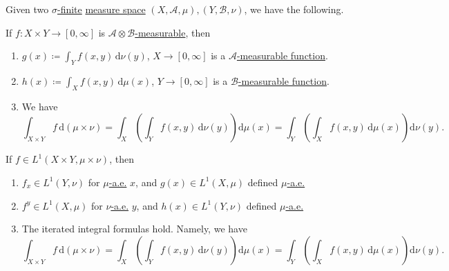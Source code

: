 \begin{theorem}\label{thm:Fubini-Tonelli-theorem}
	Given two \hyperref[def:finite-measure]{\(\sigma \)-finite} \hyperref[def:measure-space]{measure space} \((X, \mathcal{A} , \mu ), (Y, \mathcal{B} , \nu )\),
	we have the following.

	\begin{theorem*}\label{thm:Tonelli-theorem}
		If \(f\colon X\times Y\to [0, \infty ]\) is \hyperref[def:A-measurable-function]{\(\mathcal{A} \otimes \mathcal{B} \)-measurable},
		then
		\begin{enumerate}[(1)]
			\item \(g(x)\coloneqq \int_Y f(x, y)\,\mathrm{d} \nu (y)\), \(X\to [0, \infty ]\) is a \hyperref[def:A-measurable-function]{\(\mathcal{A}\)-measurable function}.
			\item \(h(x)\coloneqq \int_X f(x, y)\,\mathrm{d} \mu (x)\), \(Y\to [0, \infty ]\) is a \hyperref[def:A-measurable-function]{\(\mathcal{B}\)-measurable function}.
			\item We have
			      \[
				      \int_{X\times Y} f \,\mathrm{d}(\mu \times \nu ) = \int _X\left(\int _Y f(x, y)\,\mathrm{d}\nu (y)\right)\mathrm{d} \mu (x) = \int _Y\left(\int_X f(x, y)\,\mathrm{d} \mu (x)\right)\mathrm{d} \nu (y).
			      \]
		\end{enumerate}
	\end{theorem*}

	\begin{theorem*}\label{thm:Fubini-theorem}
		If \(f\in L^1(X\times Y, \mu \times \nu )\), then
		\begin{enumerate}[(1)]
			\item \(f_{x} \in L^1(Y, \nu )\) for \hyperref[def:mu-almost-everywhere]{\(\mu\)-a.e.} \(x\), and \(g(x)\in L^1(X, \mu )\) defined \hyperref[def:mu-almost-everywhere]{\(\mu\)-a.e.}
			\item \(f^{y} \in L^1(X, \mu )\) for \hyperref[def:mu-almost-everywhere]{\(\nu\)-a.e.} \(y\), and \(h(x)\in L^1(Y, \nu )\) defined \hyperref[def:mu-almost-everywhere]{\(\mu\)-a.e.}
			\item The iterated integral formulas hold. Namely, we have
			      \[
				      \int_{X\times Y} f \,\mathrm{d}(\mu \times \nu ) = \int _X\left(\int _Y f(x, y)\,\mathrm{d}\nu (y)\right)\mathrm{d} \mu (x) = \int _Y\left(\int_X f(x, y)\,\mathrm{d} \mu (x)\right)\mathrm{d} \nu (y).
			      \]
		\end{enumerate}
	\end{theorem*}
\end{theorem}
